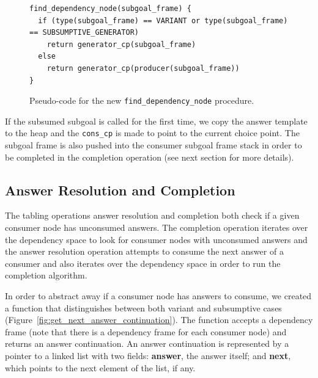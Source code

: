 \begin{figure}[ht]
\begin{Verbatim}
find_dependency_node(subgoal_frame) {
  if (type(subgoal_frame) == VARIANT or type(subgoal_frame) == SUBSUMPTIVE_GENERATOR)
    return generator_cp(subgoal_frame)
  else
    return generator_cp(producer(subgoal_frame))
}
\end{Verbatim}
\caption{Pseudo-code for the new \texttt{find\_dependency\_node} procedure.}
\label{fig:find_dependency_node}
\end{figure}

If the subsumed subgoal is called for the first time, we copy the answer template to the heap
and the \texttt{cons\_cp} is made to point to the current choice point. The subgoal frame is
also pushed into the consumer subgoal frame stack in order to be completed in the completion operation
(see next section for more details).

\subsection{Answer Resolution and Completion}

The tabling operations answer resolution and completion both check if a
given consumer node has unconsumed answers. The completion operation
iterates over the dependency space to look for consumer nodes with unconsumed
answers and the answer resolution operation attempts to consume the next answer
of a consumer and also iterates over the dependency space in order to run the completion algorithm.

In order to abstract away if a consumer node has answers to consume,
we created a function that distinguishes between both variant and subsumptive cases
(Figure~\ref{fig:get_next_answer_continuation}).
The function accepts a dependency frame (note that there is a dependency frame for
each consumer node) and returns an answer continuation.
An answer continuation is represented by a pointer to a linked list with two fields:
\textbf{answer}, the answer itself; and \textbf{next}, which points to the next element of the list,
if any.

